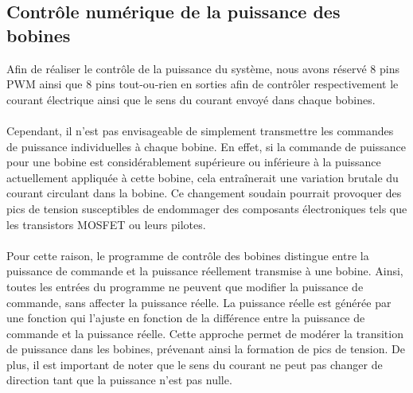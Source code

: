 \documentclass{article}
\begin{document}
    \subsection{Contrôle numérique de la puissance des bobines}
        Afin de réaliser le contrôle de la puissance du système, nous avons réservé 8 pins PWM ainsi que 8 pins tout-ou-rien en sorties afin de contrôler respectivement le courant électrique ainsi que le sens du courant envoyé dans chaque bobines.
        \\\\
Cependant, il n'est pas envisageable de simplement transmettre les commandes de puissance individuelles à chaque bobine. En effet, si la commande de puissance pour une bobine est considérablement supérieure ou inférieure à la puissance actuellement appliquée à cette bobine, cela entraînerait une variation brutale du courant circulant dans la bobine. Ce changement soudain pourrait provoquer des pics de tension susceptibles de endommager des composants électroniques tels que les transistors MOSFET ou leurs pilotes.
\\\\
Pour cette raison, le programme de contrôle des bobines distingue entre la puissance de commande et la puissance réellement transmise à une bobine. Ainsi, toutes les entrées du programme ne peuvent que modifier la puissance de commande, sans affecter la puissance réelle. La puissance réelle est générée par une fonction qui l'ajuste en fonction de la différence entre la puissance de commande et la puissance réelle. Cette approche permet de modérer la transition de puissance dans les bobines, prévenant ainsi la formation de pics de tension. De plus, il est important de noter que le sens du courant ne peut pas changer de direction tant que la puissance n'est pas nulle.
\end{document}

